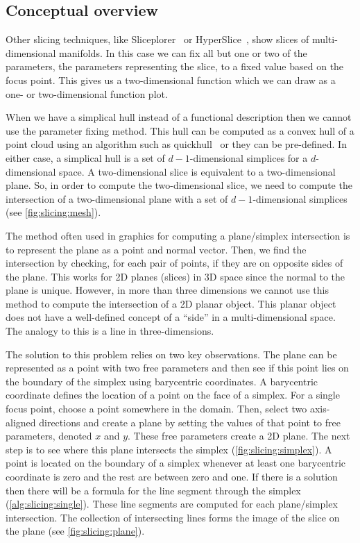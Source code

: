 \subsection{Conceptual overview}

Other slicing techniques, like Sliceplorer~\cite{Torsney-Weir:2017a} or
HyperSlice~\cite{Wijk:1993}, show slices of multi-dimensional manifolds.
In this case we can fix all but one or two of the
parameters, the parameters representing the slice, to a fixed value based on the
focus point. This gives us a two-dimensional function which we can draw as
a one- or two-dimensional function plot.

When we have a simplical hull instead of a functional description then we
cannot use the parameter fixing method. This hull can be computed as a convex
hull of a point cloud using an algorithm such as quickhull~\cite{Barber:1996}
or they can be pre-defined.  In either case, a simplical hull is a set of
\(d-1\)-dimensional simplices for a \(d\)-dimensional space. 
A two-dimensional
slice is equivalent to a two-dimensional plane. So, in order to compute the
two-dimensional slice, we need to compute the intersection of a two-dimensional
plane with a set of \(d-1\)-dimensional simplices 
(see \autoref{fig:slicing:mesh}). 

The method often used in graphics for
computing a plane/simplex intersection is to represent the plane as a point and
normal vector. Then, we find the intersection by checking, for each pair of
points, if they are on opposite sides of the plane.
This works for 2D planes (slices) in 3D space
since the normal to the plane is unique. However, in more than three dimensions
we cannot use this method to compute the intersection of a 2D planar object.
This planar object does not have a well-defined concept of a ``side'' in a
multi-dimensional space. The analogy to this is a line in three-dimensions.

The solution to this problem relies on two key observations. The plane can
be represented as
a point with two free parameters and then see if
this point lies on the boundary of the simplex using barycentric coordinates.
A barycentric coordinate defines the location of a point on the face of a simplex.
For a single focus point, choose a point somewhere in the domain. Then,
select two axis-aligned directions and create a plane by setting the values
of that point to free parameters, denoted $x$ and $y$. These free parameters
create a 2D plane. The next step is to see where this plane intersects the simplex
(\autoref{fig:slicing:simplex}). 
A point is located on the boundary of a simplex whenever at least one
barycentric coordinate is zero and the rest are between zero and one. 
If there is a solution then there will be a formula for the line segment
through the simplex (\autoref{alg:slicing:single}).
These line segments are computed for each plane/simplex intersection. The
collection of intersecting lines forms the image of the slice on the plane
(see \autoref{fig:slicing:plane}).

